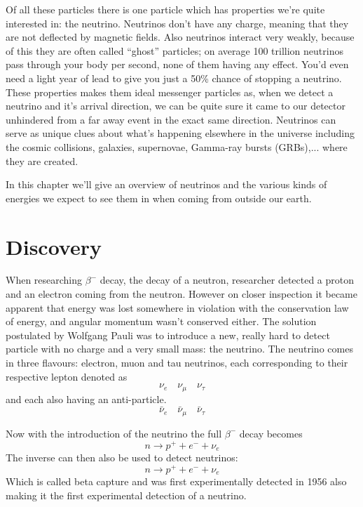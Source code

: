 \documentclass[11pt,a4paper,faculty=we,language=en,doctype=report]{cls/ugent-doc}
\begin{document}
Of all these particles there is one particle which has properties we're quite
interested in: the neutrino.  Neutrinos don't have any charge, meaning that
they are not deflected by magnetic fields. Also neutrinos interact very weakly,
because of this they are often called “ghost” particles; on average 100
trillion neutrinos pass through your body per second, none of them having any
effect.  You'd even need a light year of lead to give you just a 50\% chance of
stopping a neutrino.
These properties makes them ideal messenger particles as, when we detect a neutrino
and it's arrival direction, we can be quite sure it came to our detector unhindered
from a far away event in the exact same direction.
Neutrinos can serve as unique clues
about what’s happening elsewhere in the universe including the cosmic
collisions, galaxies, supernovae, Gamma-ray bursts (GRBs),... where they are created.

In this chapter we'll give an overview of neutrinos and the various kinds of energies we expect
to see them in when coming from outside our earth.

\section{Discovery}
When researching $\beta^-$ decay, the decay of a neutron, researcher
detected a proton and an electron coming from the neutron. However
on closer inspection it became apparent that energy was lost
somewhere in violation with the conservation law of energy, and
angular momentum wasn't conserved either.  The solution postulated by
Wolfgang Pauli was to introduce a new, really hard to detect
particle with no charge and a very small mass: the neutrino.  The neutrino comes in three flavours:
electron, muon and tau neutrinos, each corresponding to their respective lepton denoted as
\begin{equation}
	\nu_e \quad \nu_\mu \quad \nu_\tau
\end{equation}
and each also having an anti-particle.
\begin{equation}
	\bar{\nu}_e \quad \bar{\nu}_\mu \quad \bar{\nu}_\tau
\end{equation}

Now with the introduction of the neutrino the full $\beta^-$ decay
becomes
\begin{equation}
	n \rightarrow p^+ + e^- + \nu_e
\end{equation}
The inverse can then also be used to detect neutrinos:
\begin{equation}
	n \rightarrow p^+ + e^- + \nu_e
\end{equation}
Which is called beta capture and was first experimentally detected in 1956
\cite{BetaCapture} also making it the first experimental detection of a
neutrino.
\end{document}
